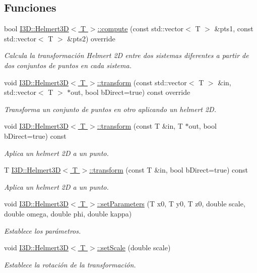 \subsection*{Funciones}
\begin{DoxyCompactItemize}
\item 
bool \hyperlink{group__trf3_d_group_gaf6c9d07daaca435365b84688326885e3}{I3\+D\+::\+Helmert3\+D$<$ T $>$\+::compute} (const std\+::vector$<$ T $>$ \&pts1, const std\+::vector$<$ T $>$ \&pts2) override
\begin{DoxyCompactList}\small\item\em Calcula la transformación Helmert 2D entre dos sistemas diferentes a partir de dos conjuntos de puntos en cada sistema. \end{DoxyCompactList}\item 
void \hyperlink{group__trf3_d_group_ga986e7df721d9a5bb12a0eed3ab10f419}{I3\+D\+::\+Helmert3\+D$<$ T $>$\+::transform} (const std\+::vector$<$ T $>$ \&in, std\+::vector$<$ T $>$ $\ast$out, bool b\+Direct=true) const  override
\begin{DoxyCompactList}\small\item\em Transforma un conjunto de puntos en otro aplicando un helmert 2D. \end{DoxyCompactList}\item 
void \hyperlink{group__trf3_d_group_gab1392ba7d1b7522384cbf73540b6682d}{I3\+D\+::\+Helmert3\+D$<$ T $>$\+::transform} (const T \&in, T $\ast$out, bool b\+Direct=true) const 
\begin{DoxyCompactList}\small\item\em Aplica un helmert 2D a un punto. \end{DoxyCompactList}\item 
T \hyperlink{group__trf3_d_group_ga89bec3a231cf507d5cdc093c7e7993c8}{I3\+D\+::\+Helmert3\+D$<$ T $>$\+::transform} (const T \&in, bool b\+Direct=true) const 
\begin{DoxyCompactList}\small\item\em Aplica un helmert 2D a un punto. \end{DoxyCompactList}\item 
void \hyperlink{group__trf3_d_group_gaed99a04af4bbb2c8d4ceaf3ec8652a71}{I3\+D\+::\+Helmert3\+D$<$ T $>$\+::set\+Parameters} (T x0, T y0, T z0, double scale, double omega, double phi, double kappa)
\begin{DoxyCompactList}\small\item\em Establece los parámetros. \end{DoxyCompactList}\item 
void \hyperlink{group__trf3_d_group_ga67cdef21b9fed12ef337833793028d15}{I3\+D\+::\+Helmert3\+D$<$ T $>$\+::set\+Scale} (double scale)
\begin{DoxyCompactList}\small\item\em Establece la rotación de la transformación. \end{DoxyCompactList}\end{DoxyCompactItemize}


